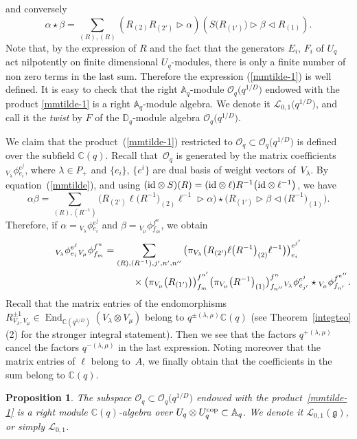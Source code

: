 \documentclass[pdftex]{sigma}%
\numberwithin{equation}{section}
\numberwithin{figure}{section}
\newtheorem{prop}[teo]{Proposition}
\newcommand{\Oq}{\Oo_{q}}
\newcommand{\OqD}{\Oo_{q}\big(q^{1/D}\big)}
\newcommand{\mc}{\mathbb{C}}
\newcommand{\Ll}{{\mathcal L}}
\newcommand{\Oo}{{\mathcal O}}
\begin{document}
and conversely
\begin{equation}\label{relprod2}
\alpha \star\beta =\sum_{(R),(R)} (R_{(2)}R_{(2')} \rhd \alpha) ({S}\big(R_{(1')}\big)\rhd \beta \lhd R_{(1)}).
\end{equation}
Note that, by the expression of $R$ and the fact that the generators $E_i$, $F_i$ of $U_q$ act nilpotently on finite dimensional $U_q$-modules, there is only a finite number of non zero terms in the last sum. Therefore the expression (\ref{mmtilde-1}) is well defined. It is easy to check that the right ${\mathbb A}_q$-module $\OqD$ endowed with the product \eqref{mmtilde-1} is a right ${\mathbb A}_q$-module algebra. We denote it $\Ll_{0,1}\big(q^{1/D}\big)$, and call it the {\it twist} by $F$ of the ${\mathbb D}_q$-module algebra $\OqD$.

We claim that the product~(\ref{mmtilde-1}) restricted to $\Oq\subset \OqD$ is defined over the subfield $\mc(q)$. Recall that~$\Oq$ is generated by the matrix coefficients ${}_{V_{\lambda}}\phi{}^{e^j}_{e_i}$, where $\lambda\in {P_+}$ and $\{e_i\}$, $\{e^i\}$ are dual basis of weight vectors of~$V_{\lambda}$. By equation~(\ref{mmtilde}), and using $({\rm id}\otimes S)(R)=({\rm id}\otimes \ell) R^{-1} \big({\rm id}\otimes \ell^{-1}\big)$, we have
\begin{equation}
\label{mmmtilde}
\alpha\beta = \sum_{(R),(R^{-1})}\big(R_{(2')}\ell \big(R^{-1}\big)_{(2)}\ell^{-1} \rhd \alpha\big) \star \big(R_{(1')}\rhd \beta \lhd \big(R^{-1}\big)_{(1)}\big).
\end{equation}
Therefore, if $\alpha= {}_{V_{\lambda}}\phi{}^{e^j}_{e_i}$ and $\beta= {}_{V_{\mu}}\phi{}^{f^n}_{f_m}$, we obtain
\begin{gather}
{}_{V_{\lambda}}\phi{}^{e^j}_{e_i}{}_{V_{\mu}}\phi{}^{f^n}_{f_m}= \sum_{(R),(R^{-1}), j', n',n'' }\big(\pi_{V_\lambda}\big(R_{(2')}\ell \big(R^{-1}\big)_{(2)}\ell^{-1}\big)\big)^{e^{j'}}_{e_i}\nonumber\\
\hphantom{{}_{V_{\lambda}}\phi{}^{e^j}_{e_i}{}_{V_{\mu}}\phi{}^{f^n}_{f_m}= \sum_{(R),(R^{-1}), j', n',n'' }}{}\times
 \big(\pi_{V_\mu}\big(R_{(1')}\big)\big)^{f^{n'}}_{f_{m}} \big(\pi_{V_\mu}\big(R^{-1}\big)_{(1)}\big)^{f^{n}}_{f_{n''}}
{}_{V_{\lambda}}\phi{}^{e^j}_{e_{j'}} \star {}_{V_{\mu}}\phi{}^{f^{n''}}_{f_{n'}}.\label{devprodq}
\end{gather}
Recall that the matrix entries of the endomorphisms $R_{V_\lambda,V_\mu}^{\pm 1} \in \operatorname{End}_{\mathbb{C}(q^{1/D})}(V_\lambda \otimes V_\mu)$ belong to $q^{\pm (\lambda,\mu)}\mc(q)$ (see Theorem~\ref{integteo}(2) for the stronger integral statement). Then we see that the factors $q^{+(\lambda,\mu)}$ cancel the factors $q^{-(\lambda,\mu)}$ in the last expression. Noting moreover that the matrix entries of $\ell$ belong to~$A$, we finally obtain that the coefficients in the sum belong to $\mc(q)$.
\begin{prop} \label{L01surq} The subspace $\Oq\subset \OqD$ endowed with the product~\eqref{mmtilde-1} is a right module $\mc(q)$-algebra over $U_q\otimes U_q^{\rm cop}\subset {\mathbb A}_q$. We denote it $\Ll_{0,1}(\mathfrak g)$, or simply $\Ll_{0,1}$.
\end{prop}
\end{document}
